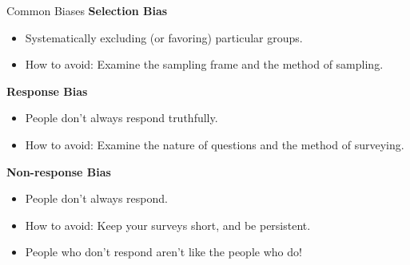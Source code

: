 \documentclass[aspectratio=169]{../latex_main/tntbeamer}  %
\begin{document}
	
	\begin{frame}{Common Biases}
	    \textbf{Selection Bias}
        \begin{itemize}
            \item Systematically excluding (or favoring) particular groups.
            \item How to avoid: Examine the sampling frame and the method of sampling.
        \end{itemize}
        \textbf{Response Bias}
        \begin{itemize}
            \item People don’t always respond truthfully.
            \item How to avoid: Examine the nature of questions and the method of surveying.
        \end{itemize}
        \textbf{Non-response Bias}
        \begin{itemize}
            \item People don’t always respond.
            \item How to avoid: Keep your surveys short, and be persistent.
            \item People who don’t respond aren’t like the people who do!
        \end{itemize}
	\end{frame}
	
\end{document}
